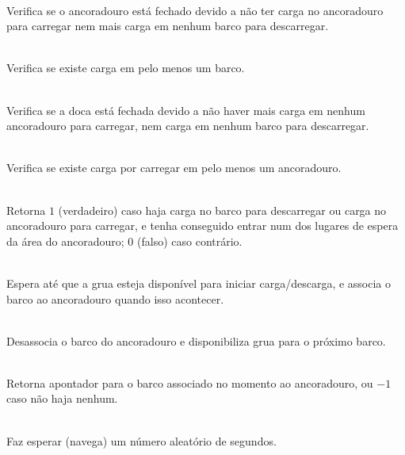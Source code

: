 \documentclass[12pt,a4paper]{report}
\begin{document}
\begin{description}[itemsep=1ex, topsep=1.5ex]

	\item {} \\
	Verifica se o ancoradouro está fechado devido a não ter carga no ancoradouro para carregar
	nem mais carga em nenhum barco para descarregar.

	\item {} \\
	Verifica se existe carga em pelo menos um barco.
	
	\item {} \\
	Verifica se a doca está fechada devido a não haver mais carga em nenhum ancoradouro para
	carregar, nem carga em nenhum barco para descarregar.
	
	\item {} \\
	Verifica se existe carga por carregar em pelo menos um ancoradouro.
	
	\item {} \\
	Retorna $1$ (verdadeiro) caso haja carga no barco para descarregar ou carga no ancoradouro
	para carregar, e tenha conseguido entrar num dos lugares de espera da área do ancoradouro;
	$0$ (falso) caso contrário.
	
	\item {} \\
	Espera até que a grua esteja disponível para iniciar carga/descarga, e associa o barco ao
	ancoradouro quando isso acontecer.
	
	\item {} \\
	Desassocia o barco do ancoradouro e disponibiliza grua para o próximo barco.
	
	\item {} \\
	Retorna apontador para o barco associado no momento ao ancoradouro, ou $-1$ caso não
	haja nenhum.
	
	\item {} \\
	Faz esperar (navega) um número aleatório de segundos.

\end{description}
\end{document}
